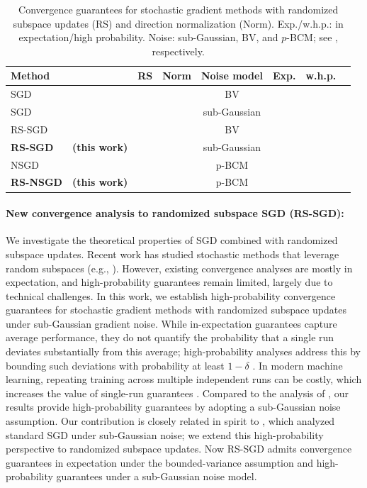 \documentclass[10pt]{article}
\newcommand{\cmark}{\ding{51}}
\begin{document}
\begin{table}[t]
\centering
\caption{
Convergence guarantees for stochastic gradient methods with randomized subspace updates (RS) and direction normalization (Norm).
Exp./w.h.p.: in expectation/high probability.
Noise: sub-Gaussian, BV, and $p$-BCM; see , respectively.
}

\label{tab:comparison}
\begin{tabular}{llcc c cc c}
\toprule
Method &
& RS
& Norm
& Noise model
& Exp.
& w.h.p.
\\
\midrule
SGD & \cite{ghadimi2013}
& 
& 
& BV
& \cmark
& 
\\

SGD & \cite{liu2023hp}
& 
& 
& sub-Gaussian
& 
& \cmark
\\

RS-SGD & \cite{flynn2024}
& \cmark
& 
& BV
& \cmark
& 
\\

\textbf{RS-SGD} &  \textbf{(this work)}
& \cmark
& 
& sub-Gaussian
& 
& \cmark
\\
\midrule
NSGD & \cite{huebler2025}
& 
& \cmark
& p-BCM
& \cmark
& \cmark
\\

\textbf{RS-NSGD} & \textbf{(this work)}
& \cmark
& \cmark
& p-BCM
& \cmark
& \cmark
\\
\bottomrule
\end{tabular}
\end{table}

\paragraph{New convergence analysis to randomized subspace SGD (RS-SGD): }
We investigate the theoretical properties of SGD combined with randomized subspace updates.
Recent work has studied stochastic methods that leverage random subspaces (e.g.,  \citet{flynn2024,han2025efficient}).
However, existing convergence analyses are mostly in expectation, and high-probability guarantees remain limited, largely due to technical challenges.
In this work, we establish high-probability convergence guarantees for stochastic gradient methods with randomized subspace updates under sub-Gaussian gradient noise.
While in-expectation guarantees capture average performance, they do not quantify the probability that a single run deviates substantially from this average; high-probability analyses address this by bounding such deviations with probability at least $1-\delta$ \citep{harvey2019,madden2024}.
In modern machine learning, repeating training across multiple independent runs can be costly, which increases the value of single-run guarantees \citep{liu2023hp}.
Compared to the analysis of \citet{flynn2024}, our results provide high-probability guarantees by adopting a sub-Gaussian noise assumption.
Our contribution is closely related in spirit to \citet{liu2023hp}, which analyzed standard SGD under sub-Gaussian noise; we extend this high-probability perspective to randomized subspace updates.
Now RS-SGD admits convergence guarantees in expectation under the bounded-variance assumption
and high-probability guarantees under a sub-Gaussian noise model.
\end{document}
